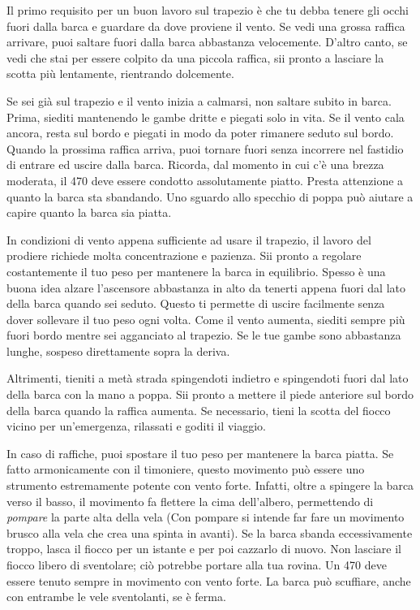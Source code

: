 Il primo requisito per un buon lavoro sul trapezio è che tu debba tenere gli
occhi fuori dalla barca e guardare da dove proviene il vento. Se vedi una grossa
raffica arrivare, puoi saltare fuori dalla barca abbastanza velocemente. D'altro
canto, se vedi che stai per essere colpito da una piccola raffica, sii pronto a
lasciare la scotta più lentamente, rientrando dolcemente.

Se sei già sul trapezio e il vento inizia a calmarsi, non saltare subito in
barca. Prima, siediti mantenendo le gambe dritte e piegati solo in vita. Se il
vento cala ancora, resta sul bordo e piegati in modo da poter rimanere seduto
sul bordo. Quando la prossima raffica arriva, puoi tornare fuori senza incorrere
nel fastidio di entrare ed uscire dalla barca. Ricorda, dal momento in cui c'è
una brezza moderata, il 470 deve essere condotto assolutamente piatto. Presta
attenzione a quanto la barca sta sbandando. Uno sguardo allo specchio di poppa
può aiutare a capire quanto la barca sia piatta.

In condizioni di vento appena sufficiente ad usare il trapezio, il lavoro del
prodiere richiede molta concentrazione e pazienza. Sii pronto a regolare
costantemente il tuo peso per mantenere la barca in equilibrio. Spesso è una
buona idea alzare l'ascensore abbastanza in alto da tenerti appena fuori dal
lato della barca quando sei seduto. Questo ti permette di uscire facilmente
senza dover sollevare il tuo peso ogni volta. Come il vento aumenta, siediti
sempre più fuori bordo mentre sei agganciato al trapezio. Se le tue gambe sono
abbastanza lunghe, sospeso direttamente sopra la deriva.

Altrimenti, tieniti a metà strada spingendoti indietro e spingendoti fuori dal lato
della barca con la mano a poppa. Sii pronto a mettere il piede anteriore sul
bordo della barca quando la raffica aumenta. Se necessario, tieni la scotta del
fiocco vicino per un'emergenza, rilassati e goditi il viaggio.

In caso di raffiche, puoi spostare il tuo peso per mantenere la barca piatta. Se fatto
armonicamente con il timoniere, questo movimento può essere uno strumento
estremamente potente con vento forte. Infatti, oltre a spingere la barca verso il basso,
il movimento fa flettere la cima dell'albero, permettendo di \emph{pompare} la parte
alta della vela (Con pompare si intende far fare un movimento brusco alla vela
che crea una spinta in avanti). Se la barca sbanda eccessivamente
troppo, lasca il fiocco per un istante e per poi cazzarlo di nuovo. Non lasciare il
fiocco libero di sventolare; ciò potrebbe portare alla tua rovina. Un 470 deve
essere tenuto sempre in movimento con vento forte. La barca può scuffiare,
anche con entrambe le vele sventolanti, se è ferma.

